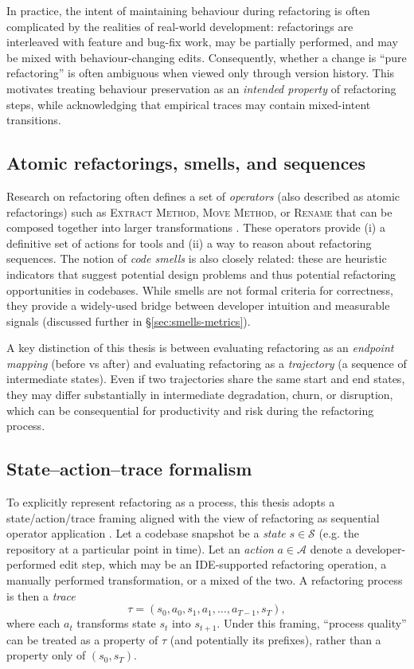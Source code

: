 In practice, the intent of maintaining behaviour during refactoring is often complicated by the realities of real-world development: refactorings are interleaved with feature and bug-fix work, may be partially performed, and may be mixed with behaviour-changing edits. Consequently, whether a change is ``pure refactoring'' is often ambiguous when viewed only through version history. This motivates treating behaviour preservation as an \emph{intended property} of refactoring steps, while acknowledging that empirical traces may contain mixed-intent transitions.

\subsection{Atomic refactorings, smells, and sequences}
 Research on refactoring often defines a set of \emph{operators} (also described as atomic refactorings) such as \textsc{Extract Method}, \textsc{Move Method}, or \textsc{Rename} that can be composed together into larger transformations \cite{fowler1999refactoring,mens2004survey}. These operators provide (i) a definitive set of actions for tools and (ii) a way to reason about refactoring sequences. The notion of \emph{code smells} is also closely related: these are heuristic indicators that suggest potential design problems and thus potential refactoring opportunities \cite{fowler1999refactoring,fowler2018refactoring} in codebases. While smells are not formal criteria for correctness, they provide a widely-used bridge between developer intuition and measurable signals (discussed further in \S\ref{sec:smells-metrics}).

A key distinction of this thesis is between evaluating refactoring as an \emph{endpoint mapping} (before vs after) and evaluating refactoring as a \emph{trajectory} (a sequence of intermediate states). Even if two trajectories share the same start and end states, they may differ substantially in intermediate degradation, churn, or disruption, which can be consequential for productivity and risk during the refactoring process.

\subsection{State--action--trace formalism}
To explicitly represent refactoring as a process, this thesis adopts a state/action/trace framing aligned with the view of refactoring as sequential operator application \cite{fowler1999refactoring,mens2004survey}. Let a codebase snapshot be a \emph{state} $s \in \mathcal{S}$ (e.g. the repository at a particular point in time). Let an \emph{action} $a \in \mathcal{A}$ denote a developer-performed edit step, which may be an IDE-supported refactoring operation, a manually performed transformation, or a mixed of the two. A refactoring process is then a \emph{trace}
\[
\tau = (s_0, a_0, s_1, a_1, \dots, a_{T-1}, s_T),
\]
where each $a_t$ transforms state $s_t$ into $s_{t+1}$. Under this framing, ``process quality'' can be treated as a property of $\tau$ (and potentially its prefixes), rather than a property only of $(s_0, s_T)$.

